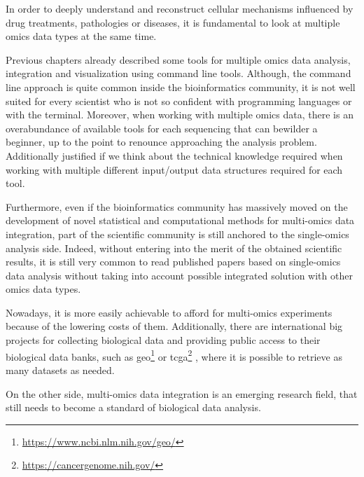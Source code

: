 In order to deeply understand and reconstruct cellular mechanisms influenced by drug treatments, pathologies or diseases, it is fundamental to look at multiple omics data types at the same time.

Previous chapters already described some tools for multiple omics data analysis, integration and visualization using command line tools.
Although, the command line approach is quite common inside the bioinformatics community, it is not well suited for every scientist who is not so confident with programming languages or with the terminal.
Moreover, when working with multiple omics data, there is an overabundance of available tools for each sequencing that can bewilder a beginner, up to the point to renounce approaching the analysis problem.
Additionally justified if we think about the technical knowledge required when working with multiple different input/output data structures required for each tool.



Furthermore, even if the bioinformatics community has massively moved on the development of novel statistical and computational methods for multi-omics data integration, part of the scientific community is still anchored to the single-omics analysis side.
Indeed, without entering into the merit of the obtained scientific results, it is still very common to read published papers based on single-omics data analysis without taking into account possible integrated solution with other omics data types.

Nowadays, it is more easily achievable to afford for multi-omics experiments because of the lowering costs of them.
Additionally, there are international big projects for collecting biological data and providing public access to their biological data banks, such as \gls{geo}\footnote{\url{https://www.ncbi.nlm.nih.gov/geo/}} \cite{Services2007} or \gls{tcga}\footnote{\url{https://cancergenome.nih.gov/}} \cite{TCGA2008}, where it is possible to retrieve as many datasets as needed.

On the other side, multi-omics data integration is an emerging research field, that still needs to become a standard of biological data analysis.

